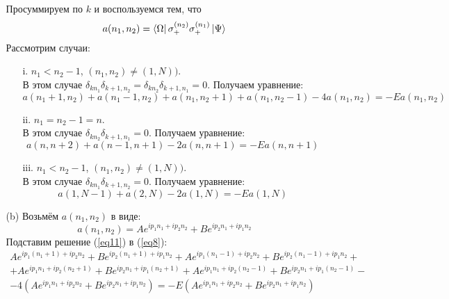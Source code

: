 \documentclass[12pt]{article}
\begin{document}
\begin{enumerate}
\begin{itemize}
\begin{multline}
        \end{multline}
        Просуммируем по $k$ и воспользуемся тем, что
        \begin{equation}
            a(n_1,n_2)=\bra{\Omega}\sigma_+^{(n_2)}\sigma_+^{(n_1)}\ket{\Psi}
        \end{equation}
        Рассмотрим случаи:
        \begin{itemize}
            \item[i.] $n_1<n_2-1$, $(n_1,n_2)\neq(1,N))$.\\
            В этом случае $\delta_{kn_1}\delta_{k+1,n_2}=\delta_{kn_2}\delta_{k+1,n_1}=0$. Получаем уравнение:
            \begin{equation}\label{eq8}
                \boxed{a(n_1+1,n_2)+a(n_1-1,n_2)+a(n_1,n_2+1)+a(n_1,n_2-1)-4a(n_1,n_2)=-Ea(n_1,n_2)}
            \end{equation}
            \item[ii.] $n_1=n_2-1=n$.\\
            В этом случае $\delta_{kn_2}\delta_{k+1,n_1}=0$. Получаем уравнение:
            \begin{equation}\label{eq9}
                \boxed{a(n,n+2)+a(n-1,n+1)-2a(n,n+1)=-Ea(n,n+1)}
            \end{equation}
            \item[iii.] $n_1<n_2-1$, $(n_1,n_2)\neq(1,N))$.\\
            В этом случае $\delta_{kn_1}\delta_{k+1,n_2}=0$. Получаем уравнение:
            \begin{equation}\label{eq10}
                \boxed{a(1,N-1)+a(2,N)-2a(1,N)=-Ea(1,N)}
            \end{equation}
        \end{itemize}
        \item[(b)] Возьмём $a(n_1,n_2)$ в виде:
        \begin{equation}\label{eq11}
            a(n_1,n_2)=Ae^{ip_1n_1+ip_2n_2}+Be^{ip_2n_1+ip_1n_2}
        \end{equation}
        Подставим решение (\ref{eq11}) в (\ref{eq8}):
        \begin{multline}
            Ae^{ip_1(n_1+1)+ip_2n_2}+Be^{ip_2(n_1+1)+ip_1n_2}+Ae^{ip_1(n_1-1)+ip_2n_2}+Be^{ip_2(n_1-1)+ip_1n_2}+\\
            +Ae^{ip_1n_1+ip_2(n_2+1)}+Be^{ip_2n_1+ip_1(n_2+1)}+Ae^{ip_1n_1+ip_2(n_2-1)}+Be^{ip_2n_1+ip_1(n_2-1)}-\\
            -4(Ae^{ip_1n_1+ip_2n_2}+Be^{ip_2n_1+ip_1n_2})=-E(Ae^{ip_1n_1+ip_2n_2}+Be^{ip_2n_1+ip_1n_2})

\end{multline}
\end{itemize}
\end{enumerate}
\end{document}
